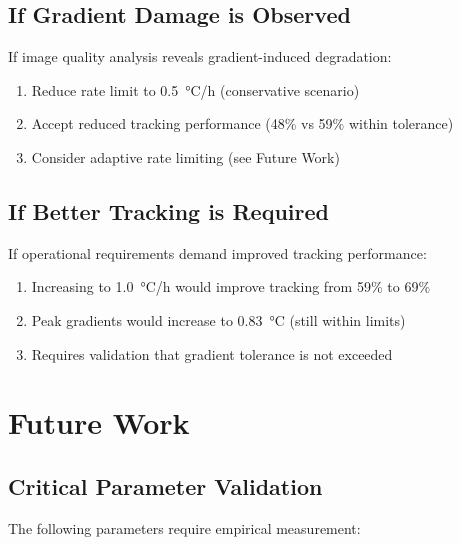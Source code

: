 \documentclass[11pt,a4paper]{article}
\begin{document}
\subsection{If Gradient Damage is Observed}

If image quality analysis reveals gradient-induced degradation:

\begin{enumerate}
    \item Reduce rate limit to \SI{0.5}{\celsius/h} (conservative scenario)
    \item Accept reduced tracking performance (48\% vs 59\% within tolerance)
    \item Consider adaptive rate limiting (see Future Work)
\end{enumerate}

\subsection{If Better Tracking is Required}

If operational requirements demand improved tracking performance:

\begin{enumerate}
    \item Increasing to \SI{1.0}{\celsius/h} would improve tracking from 59\% to 69\%
    \item Peak gradients would increase to \SI{0.83}{\celsius} (still within limits)
    \item \textcolor{warningorange}{Requires validation that gradient tolerance is not exceeded}
\end{enumerate}

\section{Future Work}

\subsection{Critical Parameter Validation}

The following parameters require empirical measurement:
\end{document}
